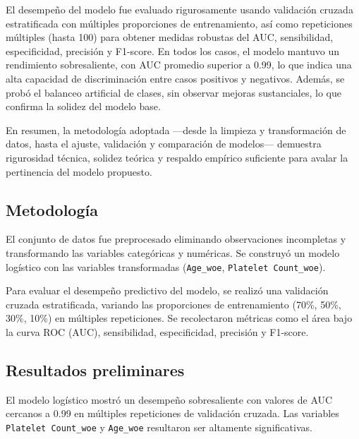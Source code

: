 \documentclass[12pt,letterpaper]{article}
\begin{document}
El desempeño del modelo fue evaluado rigurosamente usando validación cruzada estratificada con múltiples proporciones de entrenamiento, así como repeticiones múltiples (hasta 100) para obtener medidas robustas del AUC, sensibilidad, especificidad, precisión y F1-score. En todos los casos, el modelo mantuvo un rendimiento sobresaliente, con AUC promedio superior a 0.99, lo que indica una alta capacidad de discriminación entre casos positivos y negativos. Además, se probó el balanceo artificial de clases, sin observar mejoras sustanciales, lo que confirma la solidez del modelo base.

En resumen, la metodología adoptada —desde la limpieza y transformación de datos, hasta el ajuste, validación y comparación de modelos— demuestra rigurosidad técnica, solidez teórica y respaldo empírico suficiente para avalar la pertinencia del modelo propuesto.

\subsection*{Metodología}
El conjunto de datos fue preprocesado eliminando observaciones incompletas y transformando las variables categóricas y numéricas. Se construyó un modelo logístico con las variables transformadas (\texttt{Age\_woe}, \texttt{Platelet Count\_woe}).

Para evaluar el desempeño predictivo del modelo, se realizó una validación cruzada estratificada, variando las proporciones de entrenamiento (70\%, 50\%, 30\%, 10\%) en múltiples repeticiones. Se recolectaron métricas como el área bajo la curva ROC (AUC), sensibilidad, especificidad, precisión y F1-score.

\subsection*{Resultados preliminares}
El modelo logístico mostró un desempeño sobresaliente con valores de AUC cercanos a 0.99 en múltiples repeticiones de validación cruzada. Las variables \texttt{Platelet Count\_woe} y \texttt{Age\_woe} resultaron ser altamente significativas.


	
\end{document}
